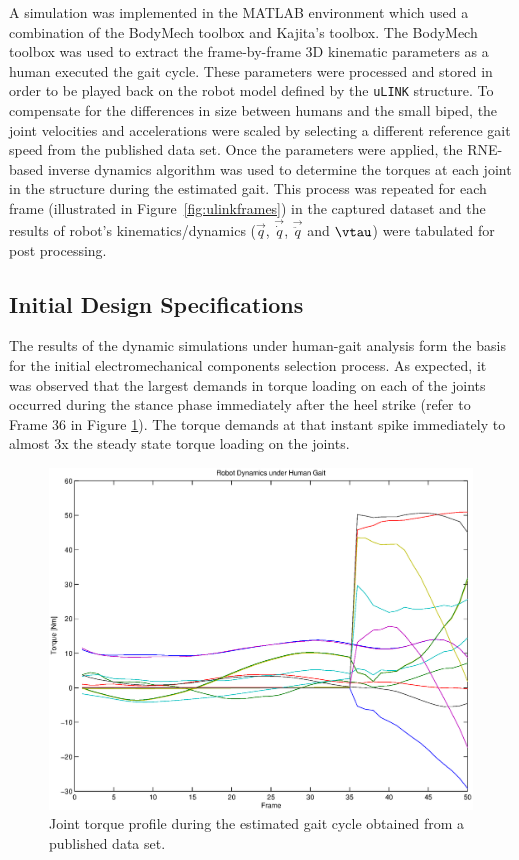 A simulation was implemented in the MATLAB environment which used a combination of the BodyMech toolbox and Kajita's toolbox. The BodyMech toolbox was used to extract the frame-by-frame 3D kinematic parameters as a human executed the gait cycle. These parameters were processed and stored in order to be played back on the robot model defined by the \texttt{uLINK} structure. To compensate for the differences in size between humans and the small biped, the joint velocities and accelerations were scaled by selecting a different reference gait speed from the published data set. Once the parameters were applied, the RNE-based inverse dynamics algorithm was used to determine the torques at each joint in the structure during the estimated gait. This process was repeated for each frame (illustrated in Figure~\ref{fig:ulinkframes}) in the captured dataset and the results of robot's kinematics/dynamics ($\vec{q}$, $\vec{\dot{q}}$, $\vec{\ddot{q}}$ and $\vtau$) were tabulated for post processing. 


\subsection{Initial Design Specifications} %
\label{sec:initial_design_requirements}
The results of the dynamic simulations under human-gait analysis form the basis for the initial electromechanical components selection process. As expected, it was observed that the largest demands in torque loading on each of the joints occurred during the stance phase immediately after the heel strike (refer to Frame 36 in Figure \ref{fig:gaitplot}). The torque demands at that instant spike immediately to almost 3x the steady state torque loading on the joints. 

\begin{figure}[!h]
	\begin{center}
    \includegraphics[scale=0.6]{fig/design/gaitplot.eps}
	\end{center}
  \caption{Joint torque profile during the estimated gait cycle obtained from a published data set.}
  	\label{fig:gaitplot}
\end{figure}

